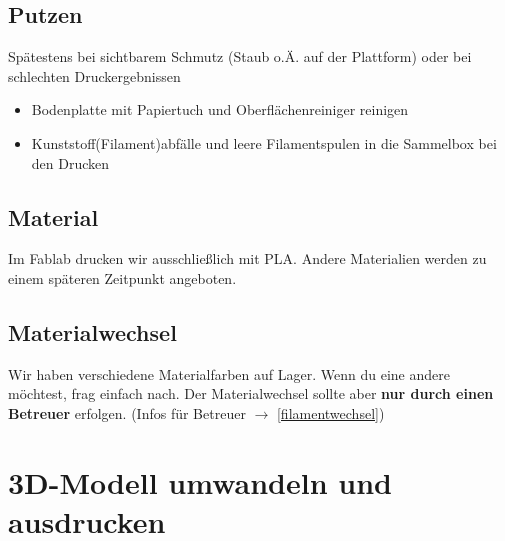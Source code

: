 \documentclass{\basedir/fablab-document}
\begin{document}
\subsection{Putzen} \label{putzen}

Spätestens bei sichtbarem Schmutz (Staub o.Ä. auf der Plattform) oder bei schlechten Druckergebnissen

\begin{itemize}
 \item Bodenplatte mit Papiertuch und Oberflächenreiniger reinigen
 \item Kunststoff(Filament)abfälle und leere Filamentspulen in die Sammelbox bei den Drucken
\end{itemize}

\subsection{Material}
Im Fablab drucken wir ausschließlich mit PLA. Andere Materialien werden zu einem späteren Zeitpunkt angeboten.

\subsection{Materialwechsel}
Wir haben verschiedene Materialfarben auf Lager. Wenn du eine andere möchtest, frag einfach nach.
Der Materialwechsel sollte aber \textbf{nur durch einen Betreuer} erfolgen. (Infos für Betreuer $\to$ \ref{filamentwechsel})


\section{3D-Modell umwandeln und ausdrucken}
\end{document}
